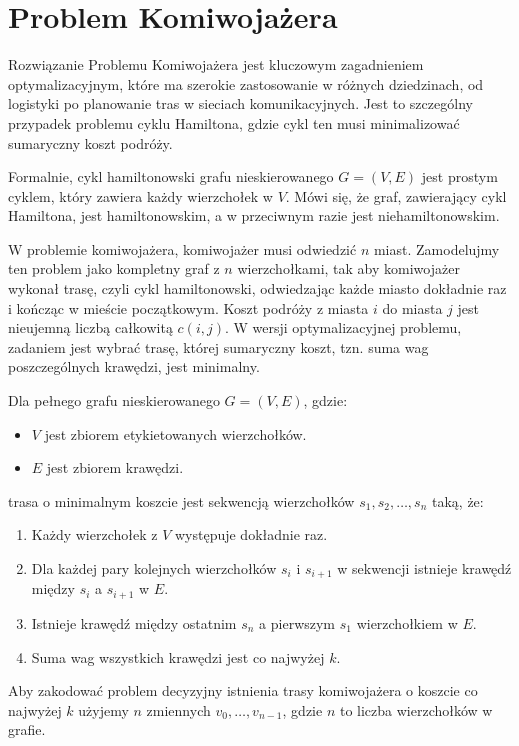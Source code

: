 

\section{Problem Komiwojażera}
Rozwiązanie Problemu Komiwojażera jest kluczowym zagadnieniem optymalizacyjnym, które ma szerokie zastosowanie w różnych dziedzinach, od logistyki po planowanie tras w sieciach komunikacyjnych. Jest to szczególny przypadek problemu cyklu Hamiltona, gdzie cykl ten musi minimalizować sumaryczny koszt podróży. 

Formalnie, cykl hamiltonowski grafu nieskierowanego $G = (V, E)$ jest prostym cyklem, który zawiera każdy wierzchołek w \(V\). Mówi się, że graf, zawierający cykl Hamiltona, jest hamiltonowskim, a w przeciwnym razie jest niehamiltonowskim. 

W problemie komiwojażera, komiwojażer musi odwiedzić \(n\) miast. Zamodelujmy ten problem jako kompletny graf z \(n\) wierzchołkami, tak aby komiwojażer wykonał trasę, czyli cykl hamiltonowski, odwiedzając każde miasto dokładnie raz i kończąc w mieście początkowym. Koszt podróży z miasta \(i\) do miasta \(j\) jest nieujemną liczbą całkowitą \(c(i, j)\). W wersji optymalizacyjnej problemu, zadaniem jest wybrać trasę, której sumaryczny koszt, tzn. suma wag poszczególnych krawędzi, jest minimalny.

Dla pełnego grafu nieskierowanego $G = (V, E)$, gdzie:
\begin{itemize}
	\item \(V\) jest zbiorem etykietowanych wierzchołków.
	\item \(E\) jest zbiorem krawędzi.
\end{itemize}
trasa o minimalnym koszcie jest sekwencją wierzchołków $s_1, s_2, …, s_n$ taką, że:
\begin{enumerate}
	\item Każdy wierzchołek z \(V\) występuje dokładnie raz.
	\item Dla każdej pary kolejnych wierzchołków \(s_i\) i \(s_{i+1}\) w sekwencji istnieje krawędź między \(s_i\) a \(s_{i+1}\) w \(E\).
	\item Istnieje krawędź między ostatnim \(s_n\) a pierwszym \(s_1\) wierzchołkiem w \(E\).
	\item Suma wag wszystkich krawędzi jest co najwyżej \(k\).
\end{enumerate}

Aby zakodować problem decyzyjny istnienia trasy komiwojażera o koszcie co najwyżej $k$ użyjemy $n$ zmiennych $v_0,\ldots,v_{n-1}$, gdzie $n$ to liczba wierzchołków w grafie.

